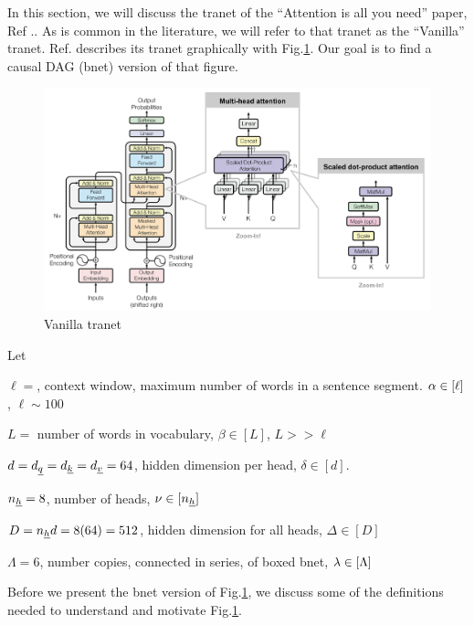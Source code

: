 In this section, we
will discuss
 the tranet of
 the \enquote{Attention is all you need} paper, Ref
 .\cite{attention-is-all-you-need}.
 As is common in the literature,
 we will refer to that tranet as 
 the \enquote{Vanilla} tranet.
 Ref.\cite{attention-is-all-you-need} describes its tranet 
 graphically with Fig.\ref{fig-vanilla-transformer}.
 Our goal
 is to find a causal DAG (bnet)
 version of that figure.

\begin{figure}[!h]
\centering
\includegraphics[width=6in]
{transformer/transformer.png}
\caption{Vanilla tranet}
\label{fig-vanilla-transformer}
\end{figure}

Let

$\ell=$, context window, maximum number of words in a sentence segment. $\alpha\in [\ell]$, $\ell\sim 100$

$L=$ number of words in vocabulary, $\beta\in[L]$, $L>> \ell$

$d=d_{\underline{q}}=d_{\underline{k}}=d_{\underline{v}}=64$, hidden dimension  per head,
$\delta\in[d]$. 

$n_{\underline{h}}=8$, number of heads, $\nu \in[n_{\underline{h}}]$

$D=n_{\underline{h}} d=8(64)=512$, hidden dimension for all heads,
$\Delta\in [D]$

$\Lambda=6$, number copies,
connected in series,
of boxed bnet, $\lambda\in[\Lambda]$



Before we present the bnet
version of Fig.\ref{fig-vanilla-transformer},
we discuss some of the 
definitions needed to
understand and motivate
 Fig.\ref{fig-vanilla-transformer}.
 

